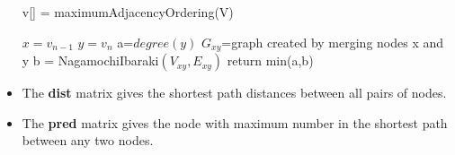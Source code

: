 \documentclass[12pt,letterpaper,titlepage,en-US]{article}
\begin{document}
\begin{itemize}
\begin{algorithm}[H]
\begin{algorithmic}[1]
        
        \State v[] = maximumAdjacencyOrdering(V)
        
        \State $x=v_{n-1}$
        \State $y=v_{n}$
        \State a=$degree(y)$
        \State$ G_{xy}$=graph created by merging nodes x and y
        \State b = NagamochiIbaraki$(V_{xy}, E_{xy})$
        \State return min(a,b)
        
     
     
      
        \EndProcedure
    \end{algorithmic}
    \end{algorithm}


\item The \textbf{dist} matrix gives the shortest path distances between all pairs of nodes.
\item 
The \textbf{pred} matrix gives the node with maximum number in the shortest path between any two nodes.
\end{itemize}
\end{document}
